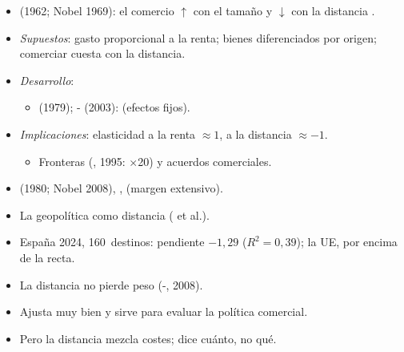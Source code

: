 \documentclass{article}
\begin{document}
\begin{columnas}
\begin{itemize}
\item {} (1962; Nobel 1969): el comercio $\uparrow$ con el tamaño y $\downarrow$ con la distancia .
\end{itemize}
\begin{itemize}
\item \emph{Supuestos}: gasto proporcional a la renta; bienes diferenciados por origen; comerciar cuesta con la distancia.
\item \emph{Desarrollo}:
  \begin{itemize}
  \item {} (1979); - (2003):  (efectos fijos).
  \end{itemize}
\item \emph{Implicaciones}: elasticidad a la renta $\approx1$, a la distancia $\approx-1$.
  \begin{itemize}
  \item Fronteras (, 1995: $\times$20) y acuerdos comerciales.
  \end{itemize}
\end{itemize}
\begin{itemize}
\item {} (1980; Nobel 2008), ,  (margen extensivo).
\item La geopolítica como distancia ( et al.).
\end{itemize}
\begin{itemize}
\item España 2024, 160~destinos: pendiente $-1{,}29$ ($R^2=0{,}39$); la UE, por encima de la recta.
\item La distancia no pierde peso (-, 2008).
\end{itemize}
\begin{itemize}
\item Ajusta muy bien y sirve para evaluar la política comercial.
\item Pero la distancia mezcla costes; dice cuánto, no qué.
\end{itemize}


\end{columnas}
\end{document}
